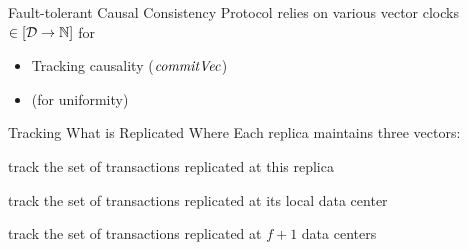 
\begin{frame}{Fault-tolerant Causal Consistency Protocol}
  \unistore{} relies on various vector clocks $\in [\mathcal{D} \to \mathbb{N}]$ for \\[6pt]

  \begin{itemize}
    \setlength{\itemsep}{8pt}
    \item Tracking causality ($\mathit{commitVec}$)
    \item {} (for uniformity)
  \end{itemize}
\end{frame}




\begin{frame}{Tracking What is Replicated Where}
  Each replica maintains three vectors: \\[5pt]

  \begin{description} %
    \setlength{\itemsep}{10pt}
    \item[$\knownVC$:] track the set of transactions replicated at this replica
    \item[$\stableVC$:] track the set of transactions replicated at its local data center
    \item[$\uniformVC$:] track the set of transactions replicated at $f + 1$ data centers
  \end{description}
\end{frame}

